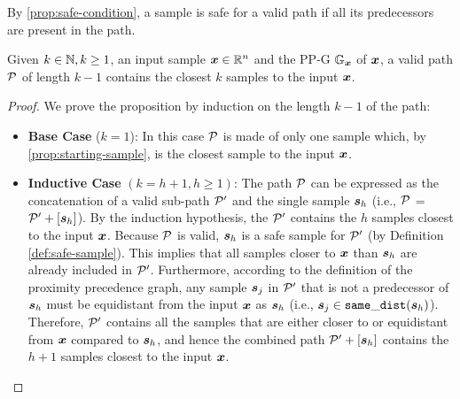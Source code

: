 \noindent By \autoref{prop:safe-condition}, a sample is safe for a valid path if all its predecessors are present in the path.

\begin{proposition}
\label{prop:valid-k-samples}
Given $k \in \N, k \ge 1$, an input sample $\vinput \in \R$ and the \acs{PP-G} $\mathbb{G}_{\vinput}$ of $\vinput$, a valid path $\vpath$ of length $k-1$ contains the closest $k$ samples to the input $\vinput$.
\end{proposition}
\begin{proof}
We prove the proposition by induction on the length $k-1$ of the path:
\begin{itemize}
  \item \textbf{Base Case} ($k = 1$): In this case $\vpath$ is made of only one sample which, by \autoref{prop:starting-sample}, is the closest sample to the input $\vinput$.
  \item \textbf{Inductive Case} $(k = h+1, h \ge 1)$: The path $\vpath$ can be expressed as the concatenation of a valid sub-path $\vpath[P^\prime]$ and the single sample $\sample[h]$ (i.e., $\vpath$ = $\vpath[P^\prime] + [\sample[h]]$). By the induction hypothesis, the $\vpath[P^\prime]$ contains the $h$ samples closest to the input $\vinput$. Because $\vpath$ is valid, $\sample[h]$ is a safe sample for $\vpath[P^\prime]$ (by Definition \autoref{def:safe-sample}). This implies that all samples closer to $\vinput$ than $\sample[h]$ are already included in $\vpath[P^\prime]$. Furthermore, according to the definition of the proximity precedence graph, any sample $\sample[j]$ in $\vpath[P^\prime]$ that is not a predecessor of $\sample[h]$ must be equidistant from the input $\vinput$ as $\sample[h]$ (i.e., $\sample[j] \in \samedist{\sample[h]}$). Therefore, $\vpath[P^\prime]$ contains all the samples that are either closer to or equidistant from $\vinput$ compared to $\sample[h]$, and hence the combined path $\vpath[P^\prime] + [\sample[h]]$ contains the $h+1$ samples closest to the input $\vinput$.
\end{itemize}
\end{proof}

